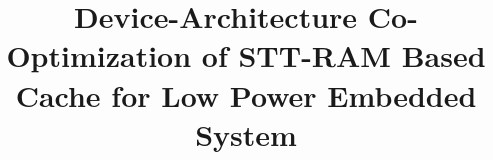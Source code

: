 \documentclass[10pt,letterpaper,conference]{IEEEtran}
\begin{document}
\title{Device-Architecture Co-Optimization of STT-RAM Based Cache for Low Power Embedded System\vspace{-10pt}}

\maketitle












\end{document}
